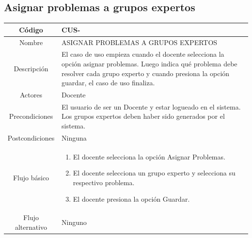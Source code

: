 \subsection{Asignar problemas a grupos expertos}
\begin{longtable}{|c|L{10cm}|}
	\toprule[0.8mm]
	Código &  CUS-\casodeuso\\  \midrule
	Nombre &  ASIGNAR PROBLEMAS A GRUPOS EXPERTOS\\  \midrule
	Descripción &  El caso de uso empieza cuando el docente selecciona la opción asignar problemas. Luego indica qué problema debe resolver cada grupo experto y cuando presiona la opción guardar, el caso de uso finaliza.\\  \midrule
	Actores &  Docente\\  \midrule
	Precondiciones &  El usuario de ser un Docente y estar logueado en el sistema. Los grupos expertos deben haber sido generados por el sistema.\\  \midrule
	Postcondiciones &  Ninguna\\  \midrule
	Flujo básico &    \begin{enumerate}
		\item El docente selecciona la opción Asignar Problemas.
		\item El docente selecciona un grupo experto y selecciona su respectivo problema.
		\item El docente presiona la opción Guardar.
	\end{enumerate}  \\ \midrule
	Flujo alternativo & Ninguno \\  \bottomrule[0.8mm]
\end{longtable}
\clearpage
